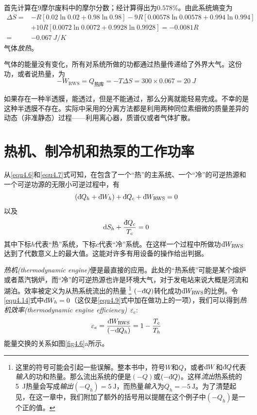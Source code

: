 首先计算在$9$摩尔废料中的摩尔分数；经计算得出为$0.578 \%$。由此系统熵变为
\[
\begin{split}
	\Delta S = & -R[0.02 \ln 0.02 + 0.98 \ln 0.98] - 9R[0.00578 \ln 0.00578 + 0.994 \ln 0.994] \\
	&+ 10R[0.0072 \ln 0.0072 +　0.9928 \ln 0.9928] = -0.0081R \\
	=& -\SI{0.067}{J/K} 
\end{split}
\]
气体{\it 放热}。

气体的能量没有变化，所有对系统所做的功都通过热量传递给了外界大气。这份功，或者说热量，为
\[-W_{\text{RWS}} = Q_{\text{热库}} = -T\Delta S = 300 \times 0.067 = \SI{20}{J} \]

如果存在一种半透膜，能透过，但是不能通过，那么分离就能轻易完成。不幸的是这种半透膜不存在。实际中采用的分离方法都是利用两种同位素细微的质量差异的动态（非准静态）过程——利用离心器，质谱仪或者气体扩散。

\section{热机、制冷机和热泵的工作功率}\label{sec4.6}
从\eqref{equ4.6}和\eqref{equ4.7}式可知，在包含了一个“热”的主系统、一个“冷”的可逆热源和一个可逆功源的无限小可逆过程中，有
\begin{equation}
(\mathrm d\hspace*{-0.1em}\bar{}\hspace*{0.08em} Q_h+\mathrm d\hspace*{-0.1em}\bar{}\hspace*{0.08em} W_h)+\mathrm d\hspace*{-0.1em}\bar{}\hspace*{0.08em} Q_c+ \mathrm d\hspace*{-0.1em}\bar{}\hspace*{0.08em} W_\text{\text{RWS}} = 0
\label{equ4.14}
\end{equation}
以及
\begin{equation}
\mathrm{d} S_h + \frac{\mathrm d\hspace*{-0.1em}\bar{}\hspace*{0.08em} Q_c}{T_c} = 0
\label{equ4.15}
\end{equation}
其中下标$h$代表“热”系统，下标$c$代表“冷”系统。在这样一个过程中所做功$\mathrm d\hspace*{-0.1em}\bar{}\hspace*{0.08em} W_\text{\text{RWS}}$达到了代数意义上的最大值。这能对许多有用设备的操作给出判据。

{\it 热机(thermodynamic engine)}便是最直接的应用。此处的“热系统”可能是某个熔炉或者蒸汽锅炉，而“冷”的可逆热源也许是环境大气，对于发电站来说大概是河流和湖泊。效率被定义为从热系统流出的热量%
\footnote{这里的符号可能会引起一些误解。整本书中，符号$W$和$Q$，或者$\mathrm d\hspace*{-0.1em}\bar{}\hspace*{0.08em} W$和$\mathrm d\hspace*{-0.1em}\bar{}\hspace*{0.08em} Q$代表{\it 输入}的功和热量。那么流出系统的便是$(-Q)$或$(-\mathrm d\hspace*{-0.1em}\bar{}\hspace*{0.08em} Q)$。这样{\it 流出}热系统的\SI{5}{\joule}热量会写成{\it 输出}$(-Q_h)=\SI{5}{\joule}$，而热量{\it 输入}为$Q_h=\SI{-5}{\joule}$。为了清楚起见，在这一章中，我们附加了额外的括号用以提醒在这个例子中$(-Q_h)$是一个正的值。}%
$(-\mathrm d\hspace*{-0.1em}\bar{}\hspace*{0.08em} Q)$转化成功$\mathrm d\hspace*{-0.1em}\bar{}\hspace*{0.08em} W_\text{\text{RWS}}$的比例。令\eqref{equ4.14}式中$\mathrm d\hspace*{-0.1em}\bar{}\hspace*{0.08em} W_h=0$（这仅是\eqref{equ4.9}式中加在做功上的一项），我们可以得到{\it 热机效率(thermodynamic engine efficiency)}\ $\varepsilon_e$:
\begin{equation}
\varepsilon_e = \frac{\mathrm d\hspace*{-0.1em}\bar{}\hspace*{0.08em} W_\text{\text{RWS}}}{(-\mathrm d\hspace*{-0.1em}\bar{}\hspace*{0.08em} Q_h)} = 1 - \frac{T_c}{T_h} 
\end{equation}
能量交换的关系如图\ref{fig4.6}a所示。


